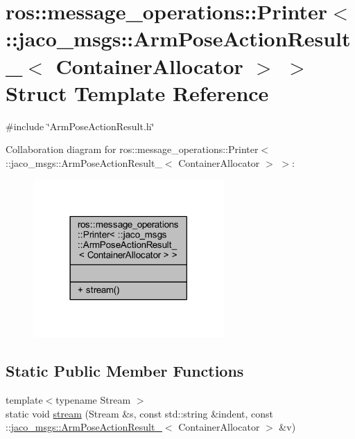\hypertarget{structros_1_1message__operations_1_1Printer_3_01_1_1jaco__msgs_1_1ArmPoseActionResult___3_01ContainerAllocator_01_4_01_4}{}\section{ros\+:\+:message\+\_\+operations\+:\+:Printer$<$ \+:\+:jaco\+\_\+msgs\+:\+:Arm\+Pose\+Action\+Result\+\_\+$<$ Container\+Allocator $>$ $>$ Struct Template Reference}
\label{structros_1_1message__operations_1_1Printer_3_01_1_1jaco__msgs_1_1ArmPoseActionResult___3_01ContainerAllocator_01_4_01_4}


{\ttfamily \#include \char`\"{}Arm\+Pose\+Action\+Result.\+h\char`\"{}}



Collaboration diagram for ros\+:\+:message\+\_\+operations\+:\+:Printer$<$ \+:\+:jaco\+\_\+msgs\+:\+:Arm\+Pose\+Action\+Result\+\_\+$<$ Container\+Allocator $>$ $>$\+:
\nopagebreak
\begin{figure}[H]
\begin{center}
\leavevmode
\includegraphics[width=206pt]{d4/de0/structros_1_1message__operations_1_1Printer_3_01_1_1jaco__msgs_1_1ArmPoseActionResult___3_01Contf9751853533896a21c9149b8d2039c23}
\end{center}
\end{figure}
\subsection*{Static Public Member Functions}
\begin{DoxyCompactItemize}
\item 
{\footnotesize template$<$typename Stream $>$ }\\static void \hyperlink{structros_1_1message__operations_1_1Printer_3_01_1_1jaco__msgs_1_1ArmPoseActionResult___3_01ContainerAllocator_01_4_01_4_a567f70f23cdc780729ce2af5abe4f73f}{stream} (Stream \&s, const std\+::string \&indent, const \+::\hyperlink{structjaco__msgs_1_1ArmPoseActionResult__}{jaco\+\_\+msgs\+::\+Arm\+Pose\+Action\+Result\+\_\+}$<$ Container\+Allocator $>$ \&v)
\end{DoxyCompactItemize}


